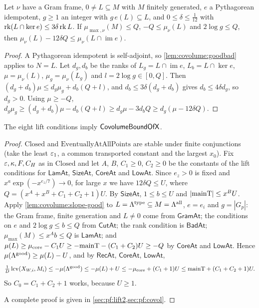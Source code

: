 \begin{lemma}\label{lem:covolume:slope-good}
Let $\nu$ have a Gram frame, $0\ne L\subseteq M$ with $M$ finitely generated, $e$ a Pythagorean
idempotent, $g\ge1$ an integer with $g\,e(L)\subseteq L$, and $0\le\delta\le\frac1{12}$ with
$\operatorname{rk}(L\cap\ker e)\le3\delta\operatorname{rk} L$. If $\mu_{\max,\nu}(M)\le Q$, $-Q\le\mu_\nu(L)$ and
$2\log g\le Q$, then $\mu_\nu(L)-12\delta Q\le\mu_\nu(L\cap\operatorname{im}e)$.
\end{lemma}

\begin{proof}
A Pythagorean idempotent is self-adjoint, so \cref{lem:covolume:goodbad} applies to $N=L$. Let
$d_g,d_b$ be the ranks of $L_g=L\cap\operatorname{im}e$, $L_b=L\cap\ker e$, $\mu=\mu_\nu(L)$,
$\mu_g=\mu_\nu(L_g)$ and $l=2\log g\in[0,Q]$. Then $(d_g+d_b)\mu\le d_g\mu_g+d_b(Q+l)$, and
$d_b\le3\delta(d_g+d_b)$ gives $d_b\le4\delta d_g$, so $d_g>0$. Using $\mu\ge-Q$,
$d_g\mu_g\ge(d_g+d_b)\mu-d_b(Q+l)\ge d_g\mu-3d_bQ\ge d_g(\mu-12\delta Q)$.
\end{proof}

\begin{theorem}\label{thm:covolume:assembly}
The eight lift conditions imply $\mathsf{CovolumeBoundOfX}$.
\end{theorem}

\begin{proof}
$\mathrm{Closed}$ and $\mathrm{EventuallyAtAllPoints}$ are stable under finite conjunctions (take the
least $\varepsilon_1$, a common transported constant and the largest $x_0$). Fix $\varepsilon,\kappa,F,C_H$ as in
$\mathrm{Closed}$ and let $A$, $B$, $C_1\ge0$, $C_2\ge0$ be the constants of the lift conditions for
$\mathsf{LamAt}$, $\mathsf{SizeAt}$, $\mathsf{CoreAt}$ and $\mathsf{LowAt}$. Since $e_z>0$ is fixed and
$x^a\exp(-x^{e_z/7})\to0$, for large $x$ we have $12\delta Q\le U$, where
$Q=(x^A+x^B+C_1+C_2+1)U$. By $\mathsf{SizeAt}$, $1\le b\le U$ and $|\mathrm{mainT}|\le x^BU$. Apply
\cref{lem:covolume:slope-good} to $L=\Lambda^{\mathrm{type}}\subseteq M=\Lambda^{\mathrm{all}}$, $e=e_i$ and
$g=|G_p|$: the Gram frame, finite generation and $L\ne0$ come from $\mathsf{GramAt}$; the conditions on
$e$ and $2\log g\le b\le Q$ from $\mathsf{CutAt}$; the rank condition is $\mathsf{BadAt}$;
$\mu_{\max}(M)\le x^Ab\le Q$ is $\mathsf{LamAt}$; and
$\mu(L)\ge\mu_{\mathrm{core}}-C_1U\ge-\mathrm{mainT}-(C_1+C_2)U\ge-Q$ by $\mathsf{CoreAt}$ and
$\mathsf{LowAt}$. Hence $\mu(\Lambda^{\mathrm{good}})\ge\mu(L)-U$, and by $\mathsf{RecAt}$, $\mathsf{CoreAt}$,
$\mathsf{LowAt}$,
\[
\tfrac1D\operatorname{lcv}(X_{W,i},M_i)\le-\mu(\Lambda^{\mathrm{good}})\le-\mu(L)+U\le-\mu_{\mathrm{core}}+(C_1+1)U
\le\mathrm{mainT}+(C_1+C_2+1)U.
\]
So $C_0=C_1+C_2+1$ works, because $U\ge1$.

A complete proof is given in \cref{sec:pf:lift2,sec:pf:covol}.
\end{proof}

